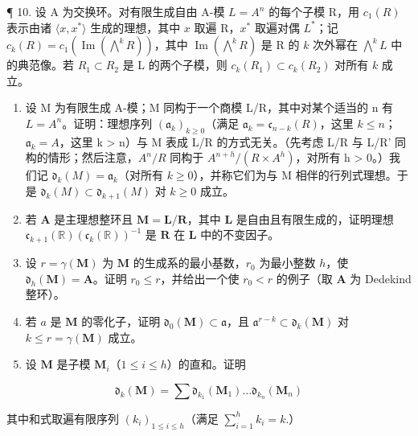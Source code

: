 ¶ 10. 设 A 为交换环。对有限生成自由 A-模 \(L = A^n\) 的每个子模 R，用 \(c_1(R)\) 表示由诸 \(\langle x, x^* \rangle\) 生成的理想，其中 \(x\) 取遍 R，\(x^*\) 取遍对偶 \(L^*\)；记 \(c_k(R) = c_1\left(\operatorname{Im}\left(\bigwedge^k R\right)\right)\)，其中 \(\operatorname{Im}\left(\bigwedge^k R\right)\) 是 R 的 \(k\) 次外幂在 \(\bigwedge^k L\) 中的典范像。若 \(R_1 \subset R_2\) 是 L 的两个子模，则 \(c_k(R_1) \subset c_k(R_2)\) 对所有 \(k\) 成立。

\begin{enumerate}
\def\labelenumi{(\alph{enumi})}
\item
  设 M 为有限生成 A-模；M 同构于一个商模 L/R，其中对某个适当的 n 有 \(L = A^{n}\)。证明：理想序列 \((\mathfrak{a}_{k})_{k \geqslant 0}\)（满足 \(\mathfrak{a}_{k} = \mathfrak{c}_{n-k}(R)\)，这里 \(k \leqslant n\)；\(\mathfrak{a}_{k} = A\)，这里 k \textgreater{} n）与 M 表成 L/R 的方式无关。（先考虑 L/R 与 L/R' 同构的情形；然后注意，\(A^{n}/R\) 同构于 \(A^{n+h}/(R \times A^{h})\)，对所有 h \textgreater{} 0。）我们记 \(\mathfrak{d}_{k}(M) = \mathfrak{a}_{k}\)（对所有 \(k \geqslant 0\)），并称它们为与 M 相伴的行列式理想。于是 \(\mathfrak{d}_{k}(M) \subset \mathfrak{d}_{k+1}(M)\) 对 \(k \geqslant 0\) 成立。
\item
  若 \(\mathbf{A}\) 是主理想整环且 \(\mathbf{M} = \mathbf{L} / \mathbf{R}\)，其中 \(\mathbf{L}\) 是自由且有限生成的，证明理想 \(\mathfrak{c}_{k + 1}(\mathbb{R})(\mathfrak{c}_k(\mathbb{R}))^{-1}\) 是 \(\mathbf{R}\) 在 \(\mathbf{L}\) 中的不变因子。
\item
  设 \(r = \gamma(\mathbf{M})\) 为 \(\mathbf{M}\) 的生成系的最小基数，\(r_0\) 为最小整数 \(h\)，使 \(\mathfrak{d}_h(\mathbf{M}) = \mathbf{A}\)。证明 \(r_0 \leqslant r\)，并给出一个使 \(r_0 < r\) 的例子（取 \(\mathbf{A}\) 为 Dedekind 整环）。
\item
  若 \(a\) 是 \(\mathbf{M}\) 的零化子，证明 \(\mathfrak{d}_0(\mathbf{M}) \subset \mathfrak{a}\)，且 \(\mathfrak{a}^{r - k} \subset \mathfrak{d}_k(\mathbf{M})\) 对 \(k \leqslant r = \gamma (\mathbf{M})\) 成立。
\item
  设 \(\mathbf{M}\) 是子模 \(\mathbf{M}_i\)（\(1 \leqslant i \leqslant h\)）的直和。证明
\end{enumerate}

\[
\mathfrak {d} _ {k} (\mathbf {M}) = \sum \mathfrak {d} _ {k _ {1}} (\mathbf {M} _ {1}) \dots \mathfrak {d} _ {k _ {n}} (\mathbf {M} _ {n})
\]

其中和式取遍有限序列 \((k_{i})_{1\leqslant i\leqslant h}\)（满足 \(\sum_{i = 1}^{h}k_{i} = k.\)）

